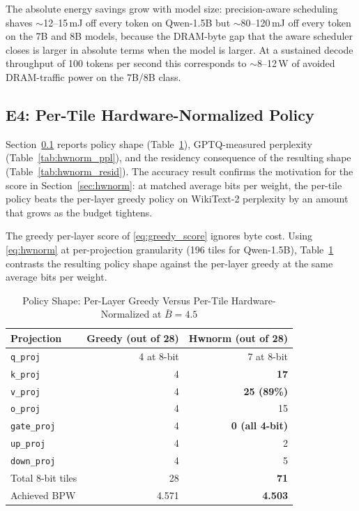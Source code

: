 \documentclass{ieeeaccess}
\begin{document}
The absolute energy savings grow with model size: precision-aware
scheduling shaves $\sim$12--15\,mJ off every token on Qwen-1.5B but
$\sim$80--120\,mJ off every token on the 7B and 8B models, because the
DRAM-byte gap that the aware scheduler closes is larger in absolute
terms when the model is larger. At a sustained decode throughput of
100 tokens per second this corresponds to $\sim$8--12\,W of avoided
DRAM-traffic power on the 7B/8B class.

\subsection{E4: Per-Tile Hardware-Normalized Policy}
\label{sec:e4}

Section~\ref{sec:e4} reports policy shape (Table~\ref{tab:hwnorm_shape}),
GPTQ-measured perplexity (Table~\ref{tab:hwnorm_ppl}), and the residency
consequence of the resulting shape (Table~\ref{tab:hwnorm_resid}). The
accuracy result confirms the motivation for the score in
Section~\ref{sec:hwnorm}: at matched average bits per weight, the
per-tile policy beats the per-layer greedy policy on WikiText-2
perplexity by an amount that grows as the budget tightens.

The greedy per-layer score of \eqref{eq:greedy_score} ignores byte
cost. Using \eqref{eq:hwnorm} at per-projection granularity (196 tiles
for Qwen-1.5B), Table~\ref{tab:hwnorm_shape} contrasts the resulting
policy shape against the per-layer greedy at the same average bits per
weight.

\begin{table}[t]
\caption{Policy Shape: Per-Layer Greedy Versus Per-Tile Hardware-Normalized at $\bar B = 4.5$}
\label{tab:hwnorm_shape}
\centering
\begin{tabular}{lrr}
\toprule
Projection & Greedy (out of 28) & Hwnorm (out of 28) \\
\midrule
\texttt{q\_proj}    & 4 at 8-bit & 7 at 8-bit \\
\texttt{k\_proj}    & 4          & \textbf{17}        \\
\texttt{v\_proj}    & 4          & \textbf{25 (89\%)} \\
\texttt{o\_proj}    & 4          & 15         \\
\texttt{gate\_proj} & 4          & \textbf{0 (all 4-bit)} \\
\texttt{up\_proj}   & 4          & 2          \\
\texttt{down\_proj} & 4          & 5          \\
\midrule
Total 8-bit tiles & 28 & \textbf{71} \\
Achieved BPW      & 4.571 & \textbf{4.503} \\
\bottomrule
\end{tabular}
\end{table}
\end{document}
